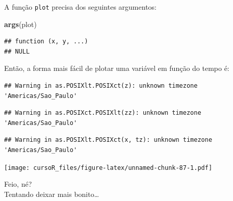\documentclass[]{book}
\newenvironment{Shaded}{\begin{snugshade}}{\end{snugshade}}
\newcommand{\KeywordTok}[1]{\textcolor[rgb]{0.13,0.29,0.53}{\textbf{#1}}}
\newcommand{\DataTypeTok}[1]{\textcolor[rgb]{0.13,0.29,0.53}{#1}}
\newcommand{\DecValTok}[1]{\textcolor[rgb]{0.00,0.00,0.81}{#1}}
\newcommand{\StringTok}[1]{\textcolor[rgb]{0.31,0.60,0.02}{#1}}
\newcommand{\CommentTok}[1]{\textcolor[rgb]{0.56,0.35,0.01}{\textit{#1}}}
\newcommand{\OperatorTok}[1]{\textcolor[rgb]{0.81,0.36,0.00}{\textbf{#1}}}
\newcommand{\NormalTok}[1]{#1}
\theoremstyle{definition}
\theoremstyle{definition}
\theoremstyle{definition}
\theoremstyle{remark}
\begin{document}
A função \texttt{plot} precisa dos seguintes argumentos:

\begin{Shaded}
\begin{Highlighting}[]
\KeywordTok{args}\NormalTok{(plot)}
\end{Highlighting}
\end{Shaded}

\begin{verbatim}
## function (x, y, ...) 
## NULL
\end{verbatim}

Então, a forma mais fácil de plotar uma variável em função do tempo é:

\begin{Shaded}
\end{Shaded}

\begin{verbatim}
## Warning in as.POSIXlt.POSIXct(z): unknown timezone 'Americas/Sao_Paulo'
\end{verbatim}

\begin{verbatim}
## Warning in as.POSIXct.POSIXlt(zz): unknown timezone 'Americas/Sao_Paulo'
\end{verbatim}

\begin{verbatim}
## Warning in as.POSIXlt.POSIXct(x, tz): unknown timezone 'Americas/Sao_Paulo'
\end{verbatim}

\texttt{[image: cursoR\_files/figure-latex/unnamed-chunk-87-1.pdf]}

Feio, né?\\
Tentando deixar mais bonito\ldots{}

\begin{Shaded}
\end{Shaded}
\end{document}
